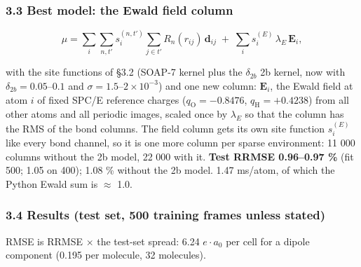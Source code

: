 \documentclass[
  10pt,
]{article}
\begin{document}
\subsubsection{3.3 Best model: the Ewald field column}\label{best-model-the-ewald-field-column}

\[
\mu=\sum_i\sum_{n,t'} s^{(n,t')}_i\sum_{j\in t'}R_n(r_{ij})\,\mathbf d_{ij}
\;+\;\sum_i s^{(E)}_i\,\lambda_E\,\mathbf E_i ,
\]

with the site functions of §3.2 (SOAP-7 kernel plus the \(\delta_{2b}\) 2b kernel, now with
\(\delta_{2b}=0.05\)--\(0.1\) and \(\sigma=1.5\)--\(2\times10^{-3}\)) and one new column:
\(\mathbf E_i\), the Ewald field at atom \(i\) of fixed SPC/E reference charges
(\(q_\mathrm O=-0.8476\), \(q_\mathrm H=+0.4238\)) from all other atoms and all periodic images,
scaled once by \(\lambda_E\) so that the column has the RMS of the bond columns. The field column
gets its own site function \(s^{(E)}_i\) like every bond channel, so it is one more column per
sparse environment: 11 000 columns without the 2b model, 22 000 with it. \textbf{Test RRMSE
0.96--0.97 \%} (fit 500; 1.05 on 400); 1.08 \% without the 2b model. 1.47 ms/atom, of which the
Python Ewald sum is \(\approx\) 1.0.

\subsubsection{3.4 Results (test set, 500 training frames unless
stated)}\label{results-test-set-500-training-frames-unless-stated}

RMSE is RRMSE \(\times\) the test-set spread: 6.24 \(e\cdot a_0\) per cell for a dipole component
(0.195 per molecule, 32 molecules).
\end{document}
